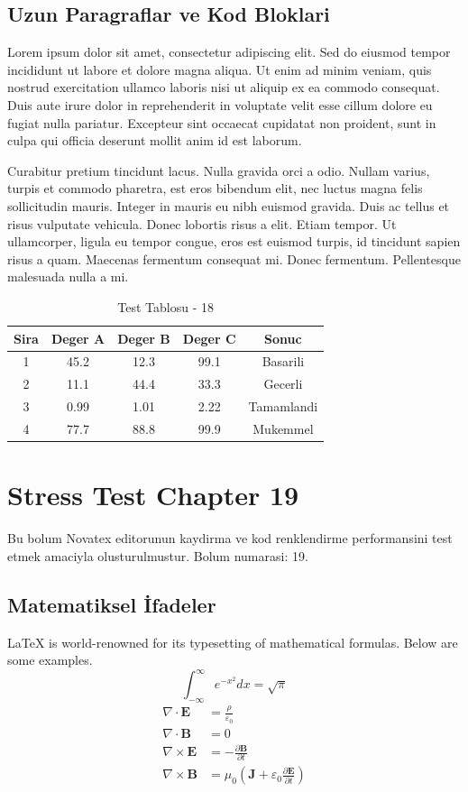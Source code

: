 \documentclass[12pt,a4paper]{article}
\begin{document}
\subsection{Uzun Paragraflar ve Kod Bloklari}
Lorem ipsum dolor sit amet, consectetur adipiscing elit. Sed do eiusmod tempor incididunt ut labore et dolore magna aliqua. Ut enim ad minim veniam, quis nostrud exercitation ullamco laboris nisi ut aliquip ex ea commodo consequat. Duis aute irure dolor in reprehenderit in voluptate velit esse cillum dolore eu fugiat nulla pariatur. Excepteur sint occaecat cupidatat non proident, sunt in culpa qui officia deserunt mollit anim id est laborum.

Curabitur pretium tincidunt lacus. Nulla gravida orci a odio. Nullam varius, turpis et commodo pharetra, est eros bibendum elit, nec luctus magna felis sollicitudin mauris. Integer in mauris eu nibh euismod gravida. Duis ac tellus et risus vulputate vehicula. Donec lobortis risus a elit. Etiam tempor. Ut ullamcorper, ligula eu tempor congue, eros est euismod turpis, id tincidunt sapien risus a quam. Maecenas fermentum consequat mi. Donec fermentum. Pellentesque malesuada nulla a mi.

\begin{table}[h!]
\centering
\begin{tabular}{|c|c|c|c|c|}
\hline
\textbf{Sira} & \textbf{Deger A} & \textbf{Deger B} & \textbf{Deger C} & \textbf{Sonuc} \\
\hline
1 & 45.2 & 12.3 & 99.1 & Basarili \\
2 & 11.1 & 44.4 & 33.3 & Gecerli \\
3 & 0.99 & 1.01 & 2.22 & Tamamlandi \\
4 & 77.7 & 88.8 & 99.9 & Mukemmel \\
\hline
\end{tabular}
\caption{Test Tablosu - 18}
\end{table}

\newpage
\section{Stress Test Chapter 19}
Bu bolum Novatex editorunun kaydirma ve kod renklendirme performansini test etmek amaciyla olusturulmustur. Bolum numarasi: 19.

\subsection{Matematiksel İfadeler}
\LaTeX{} is world-renowned for its typesetting of mathematical formulas. Below are some examples.
\begin{equation}
\int_{-\infty}^{\infty} e^{-x^2} dx = \sqrt{\pi}
\end{equation}
\begin{align}
\nabla \cdot \mathbf{E} &= \frac{\rho}{\varepsilon_0} \\
\nabla \cdot \mathbf{B} &= 0 \\
\nabla \times \mathbf{E} &= -\frac{\partial \mathbf{B}}{\partial t} \\
\nabla \times \mathbf{B} &= \mu_0\left(\mathbf{J} + \varepsilon_0 \frac{\partial \mathbf{E}}{\partial t}\right)
\end{align}
\end{document}
